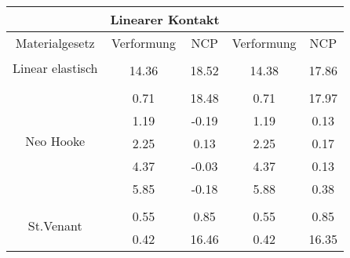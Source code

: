 \begin{table} 
\centering 
\begin{tabular}{c|cc|cc|} 
\cline{2-5} 
 & \multicolumn{2}{|c|}{Linearer Kontakt} &  \\ 
\hline 
\multicolumn{1}{|c|}{Materialgesetz} & \multicolumn{1}{c|}{Verformung} & \multicolumn{1}{c|}{NCP} & \multicolumn{1}{c|}{Verformung} & \multicolumn{1}{c|}{NCP} \\ 
\hline 
\multicolumn{1}{|c|}{\multirow{2}{*}{Linear elastisch}} &\multicolumn{1}{|c|}{} & \multicolumn{1}{|c|}{} & \multicolumn{1}{|c|}{} & \multicolumn{1}{|c|}{} \\ 
\multicolumn{1}{|c|}{} & \multicolumn{1}{|c|}{     14.36} & \multicolumn{1}{|c|}{     18.52} & \multicolumn{1}{|c|}{     14.38} & \multicolumn{1}{|c|}{     17.86} \\ 
\hline 
\multicolumn{1}{|c|}{\multirow{6}{*}{Neo Hooke}} &\multicolumn{1}{|c|}{} & \multicolumn{1}{|c|}{} & \multicolumn{1}{|c|}{} & \multicolumn{1}{|c|}{} \\ 
\multicolumn{1}{|c|}{} & \multicolumn{1}{|c|}{      0.71} & \multicolumn{1}{|c|}{     18.48} & \multicolumn{1}{|c|}{      0.71} & \multicolumn{1}{|c|}{     17.97} \\ 
\multicolumn{1}{|c|}{} & \multicolumn{1}{|c|}{      1.19} & \multicolumn{1}{|c|}{     -0.19} & \multicolumn{1}{|c|}{      1.19} & \multicolumn{1}{|c|}{      0.13} \\ 
\multicolumn{1}{|c|}{} & \multicolumn{1}{|c|}{      2.25} & \multicolumn{1}{|c|}{      0.13} & \multicolumn{1}{|c|}{      2.25} & \multicolumn{1}{|c|}{      0.17} \\ 
\multicolumn{1}{|c|}{} & \multicolumn{1}{|c|}{      4.37} & \multicolumn{1}{|c|}{     -0.03} & \multicolumn{1}{|c|}{      4.37} & \multicolumn{1}{|c|}{      0.13} \\ 
\multicolumn{1}{|c|}{} & \multicolumn{1}{|c|}{      5.85} & \multicolumn{1}{|c|}{     -0.18} & \multicolumn{1}{|c|}{      5.88} & \multicolumn{1}{|c|}{      0.38} \\ 
\hline 
\multicolumn{1}{|c|}{\multirow{9}{*}{St.Venant}} &\multicolumn{1}{|c|}{} & \multicolumn{1}{|c|}{} & \multicolumn{1}{|c|}{} & \multicolumn{1}{|c|}{} \\ 
\multicolumn{1}{|c|}{} & \multicolumn{1}{|c|}{      0.55} & \multicolumn{1}{|c|}{      0.85} & \multicolumn{1}{|c|}{      0.55} & \multicolumn{1}{|c|}{      0.85} \\ 
\multicolumn{1}{|c|}{} & \multicolumn{1}{|c|}{      0.42} & \multicolumn{1}{|c|}{     16.46} & \multicolumn{1}{|c|}{      0.42} & \multicolumn{1}{|c|}{     16.35} \\ 

\end{tabular}
\end{table}
